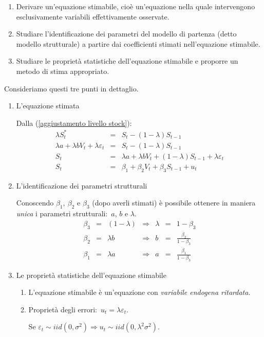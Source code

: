 \documentclass[a4paper]{report}
\theoremstyle{remark}
\begin{document}
\begin{enumerate}
\item Derivare un'equazione stimabile, cio\`{e} un'equazione nella quale
intervengono esclusivamente variabili effettivamente osservate.

\item Studiare l'identificazione dei parametri del modello di partenza
(detto modello strutturale) a partire dai coefficienti stimati
nell'equazione stimabile.

\item Studiare le propriet\`{a} statistiche dell'equazione stimabile e
proporre un metodo di stima appropriato.
\end{enumerate}

\noindent Consideriamo questi tre punti in dettaglio.

\begin{enumerate}
\item L'equazione stimata

Dalla (\ref{aggiustamento livello stock}):%
\begin{eqnarray*}
\lambda S_{t}^{\ast } &=&S_{t}-(1-\lambda )S_{t-1} \\
\lambda a+\lambda bV_{t}+\lambda \varepsilon _{t} &=&S_{t}-(1-\lambda
)S_{t-1} \\
S_{t} &=&\lambda a+\lambda bV_{t}+(1-\lambda )S_{t-1}+\lambda \varepsilon
_{t} \\
S_{t} &=&\beta _{1}+\beta _{2}V_{t}+\beta _{3}S_{t-1}+u_{t}
\end{eqnarray*}

\item L'identificazione dei parametri strutturali

Conoscendo $\beta _{1},\ \beta _{2}$ e $\beta _{3}$ (dopo averli stimati) 
\`{e} possibile ottenere in maniera \emph{unica} i parametri strutturali:\ $%
a $, $b$ e $\lambda $.%
\begin{equation*}
\begin{array}{ccccccc}
\beta _{3} & = & (1-\lambda ) & \Rightarrow & \lambda & = & 1-\beta _{3} \\ 
\beta _{2} & = & \lambda b & \Rightarrow & b & = & \frac{\beta _{2}}{1-\beta
_{3}} \\ 
\beta _{1} & = & \lambda a & \Rightarrow & a & = & \frac{\beta _{1}}{1-\beta
_{3}}%
\end{array}%
\end{equation*}

\item Le propriet\`{a} statistiche dell'equazione stimabile

\begin{enumerate}
\item L'equazione stimabile \`{e} un'equazione con \emph{variabile endogena
ritardata}.

\item Propriet\`{a} degli errori:\ $u_{t}=\lambda \varepsilon _{t}$.

Se $\varepsilon _{t}\sim iid(0,\sigma ^{2})\Rightarrow u_{t}\sim
iid(0,\lambda ^{2}\sigma ^{2})$.
\end{enumerate}
\end{enumerate}
\end{document}
